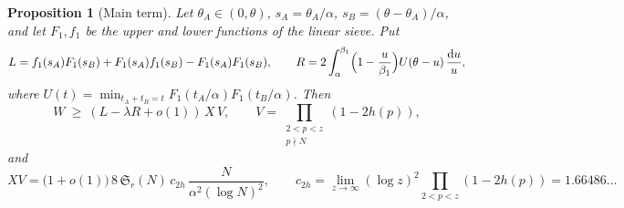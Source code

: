\documentclass[11pt]{amsart}
\newtheorem{proposition}[theorem]{Proposition}
\theoremstyle{remark}
\newcommand{\Sg}{\mathfrak{S}}
\newcommand{\dd}{\mathrm{d}}
\begin{document}
\begin{proposition}[Main term]\label{prop:W}
Let $\theta_A\in(0,\theta)$, $s_A=\theta_A/\alpha$, $s_B=(\theta-\theta_A)/\alpha$, and let $F_1,f_1$ be the upper and lower functions of the linear sieve. Put
\[
L=f_1(s_A)F_1(s_B)+F_1(s_A)f_1(s_B)-F_1(s_A)F_1(s_B),\qquad
R=2\int_\alpha^{\beta_1}\Bigl(1-\frac u{\beta_1}\Bigr)U(\theta-u)\,\frac{\dd u}{u},
\]
where $U(t)=\min_{t_A+t_B=t}F_1(t_A/\alpha)F_1(t_B/\alpha)$. Then
\[
W\ \ge\ (L-\lambda R+o(1))\,X\,V,\qquad V=\prod_{\substack{2<p<z\\ p\nmid N}}(1-2h(p)),
\]
and
\begin{equation}\label{eq:XV}
XV=\bigl(1+o(1)\bigr)\,8\,\Sg_r(N)\,c_{2h}\,\frac{N}{\alpha^2(\log N)^2},\qquad
c_{2h}=\lim_{z\to\infty}(\log z)^2\prod_{2<p<z}(1-2h(p))=1.66486\ldots
\end{equation}
\end{proposition}
\end{document}
